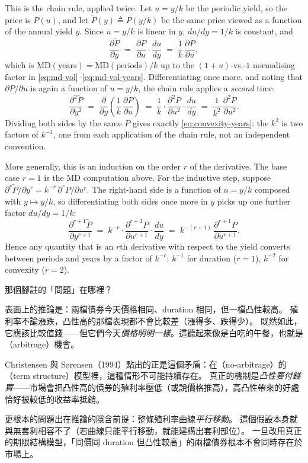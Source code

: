 \suppstart
\begin{note}
	This is the chain rule, applied twice. Let $u=y/k$ be the periodic yield, so the price is $P(u)$, and let $\widetilde P(y)\triangleq P(y/k)$ be the same price viewed as a function of the annual yield $y$. Since $u=y/k$ is linear in $y$, $du/dy=1/k$ is constant, and
	\[
		\frac{\partial \widetilde P}{\partial y} \;=\; \frac{\partial P}{\partial u}\cdot\frac{du}{dy} \;=\; \frac1k\,\frac{\partial P}{\partial u} ,
	\]
	which is $\mathrm{MD}(\text{years})=\mathrm{MD}(\text{periods})/k$ up to the $(1+u)$-vs.-$1$ normalising factor in \eqref{eq:md-vol}--\eqref{eq:md-vol-years}. Differentiating once more, and noting that $\partial P/\partial u$ is again a function of $u=y/k$, the chain rule applies a \emph{second} time:
	\[
		\frac{\partial^{2}\widetilde P}{\partial y^{2}}
		\;=\; \frac{\partial}{\partial y}\!\left(\frac1k\,\frac{\partial P}{\partial u}\right)
		\;=\; \frac1k\cdot\frac{\partial^{2}P}{\partial u^{2}}\cdot\frac{du}{dy}
		\;=\; \frac{1}{k^{2}}\,\frac{\partial^{2}P}{\partial u^{2}} .
	\]
	Dividing both sides by the same $P$ gives exactly \eqref{eq:convexity-years}: the $k^{2}$ is two factors of $k^{-1}$, one from each application of the chain rule, not an independent convention.

	More generally, this is an induction on the order $r$ of the derivative. The base case $r=1$ is the MD computation above. For the inductive step, suppose $\partial^{r}\widetilde P/\partial y^{r}=k^{-r}\,\partial^{r}P/\partial u^{r}$. The right-hand side is a function of $u=y/k$ composed with $y\mapsto y/k$, so differentiating both sides once more in $y$ picks up one further factor $du/dy=1/k$:
	\[
		\frac{\partial^{r+1}\widetilde P}{\partial y^{r+1}} \;=\; k^{-r}\cdot\frac{\partial^{r+1}P}{\partial u^{r+1}}\cdot\frac{du}{dy} \;=\; k^{-(r+1)}\,\frac{\partial^{r+1}P}{\partial u^{r+1}} .
	\]
	Hence any quantity that is an $r$th derivative with respect to the yield converts between periods and years by a factor of $k^{-r}$: $k^{-1}$ for duration ($r=1$), $k^{-2}$ for convexity ($r=2$).
\end{note}

\begin{remark}
	那個腳註的「問題」在哪裡？

	表面上的推論是：兩檔債券今天價格相同、duration 相同，但一檔凸性較高。
	殖利率不論漲跌，凸性高的那檔表現都不會比較差（漲得多、跌得少）。
	既然如此，它應該比較值錢——但它們今天\emph{價格明明一樣}。這聽起來像是白吃的午餐，也就是（arbitrage）機會。

	Christensen 與 S\o rensen（1994）點出的正是這個矛盾：在（no-arbitrage）的（term structure）模型裡，這種情形不可能持續存在。
	真正的機制是\emph{凸性要付錢買}——市場會把凸性高的債券的殖利率壓低（或說價格推高），高凸性帶來的好處恰好被較低的收益率抵銷。

	更根本的問題出在推論的隱含前提：整條殖利率曲線\emph{平行移動}。
	這個假設本身就與無套利相容不了（若曲線只能平行移動，就能建構出套利部位）。
	一旦改用真正的期限結構模型，「同價同 duration 但凸性較高」的兩檔債券根本不會同時存在於市場上。
\end{remark}
\suppend

